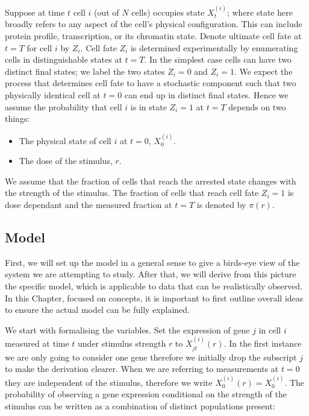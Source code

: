 
Suppose at time $t$ cell $i$ (out of $N$ cells) occupies state $X_{t}^{(i)}$; where state here broadly refers to any aspect of the cell's physical configuration. This can include protein profile, transcription, or its chromatin state. Denote ultimate cell fate at $t=T$ for cell $i$ by $Z_i$. Cell fate $Z_i$ is determined experimentally by enumerating cells in distinguishable states at $t=T$. In the simplest case cells can have two distinct final states; we label the two states $Z_i = 0$ and $Z_i = 1$. We expect the process that determines cell fate to have a stochastic component such that two physically identical cell at $t=0$ can end up in distinct final states. Hence we assume the probability that cell $i$ is in state $Z_i = 1$ at $t=T$ depends on two things:

\begin{itemize}
\item The physical state of cell $i$ at $t=0$, $X_{0}^{(i)} $.
\item The dose of the stimulus, $r$.
\end{itemize}

We assume that the fraction of cells that reach the arrested state changes with the strength of the stimulus. The fraction of cells that reach cell fate $Z_i = 1$ is dose dependant and the measured fraction at $t=T$ is denoted by $\pi(r)$.

\subsection{Model}
\label{sec:model-cell}

First, we will set up the model in a general sense to give a birds-eye view of the system we are attempting to study. After that, we will derive from this picture the specific model, which is applicable to data that can be realistically observed. In this Chapter, focused on concepts, it is important to first outline overall ideas to ensure the actual model can be fully explained.

We start with formalising the variables. Set the expression of gene $j$ in cell $i$ measured at time $t $ under stimulus strength $r$ to $X_{jt}^{(i)}(r)$. In the first instance we are only going to consider one gene therefore we initially drop the subscript $j$ to make the derivation clearer. When we are referring to measurements at $t=0$ they are independent of the stimulus, therefore we write $X_0^{(i)}(r) = X_0^{(i)}$. The probability of observing a gene expression conditional on the strength of the stimulus can be written as a combination of distinct populations present:

